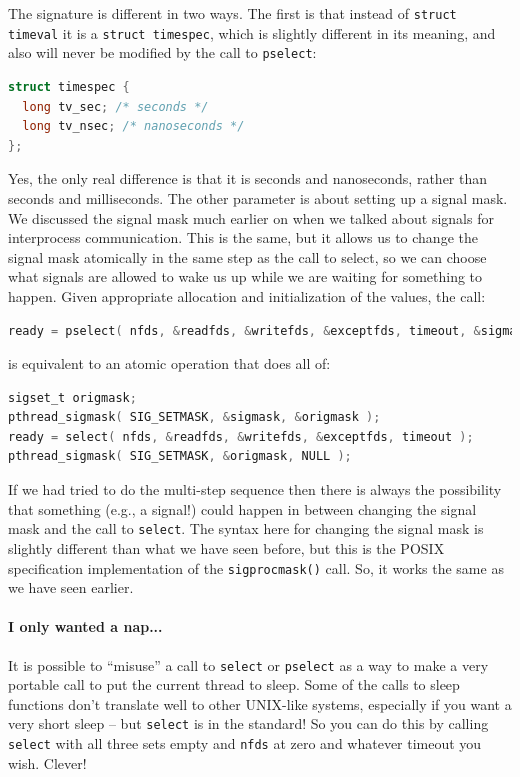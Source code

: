 \documentclass[a4paper]{report}
\begin{document}
The signature is different in two ways. The first is that instead of \texttt{struct timeval} it is a \texttt{struct timespec}, which is slightly different in its meaning, and also will never be modified by the call to \texttt{pselect}:

\begin{lstlisting}[language=C]
struct timespec {
  long tv_sec; /* seconds */
  long tv_nsec; /* nanoseconds */
};
\end{lstlisting}

Yes, the only real difference is that it is seconds and nanoseconds, rather than seconds and milliseconds. The other parameter is about setting up a signal mask. We discussed the signal mask much earlier on when we talked about signals for interprocess communication. This is the same, but it allows us to change the signal mask atomically in the same step as the call to select, so we can choose what signals are allowed to wake us up while we are waiting for something to happen. Given appropriate allocation and initialization of the values, the call:


\begin{lstlisting}[language=C]
ready = pselect( nfds, &readfds, &writefds, &exceptfds, timeout, &sigmask );
\end{lstlisting}

is equivalent to an atomic operation that does all of:

\begin{lstlisting}[language=C]
sigset_t origmask;
pthread_sigmask( SIG_SETMASK, &sigmask, &origmask );
ready = select( nfds, &readfds, &writefds, &exceptfds, timeout );
pthread_sigmask( SIG_SETMASK, &origmask, NULL );
\end{lstlisting}

If we had tried to do the multi-step sequence then there is always the possibility that something (e.g., a signal!) could happen in between changing the signal mask and the call to \texttt{select}. The syntax here for changing the signal mask is slightly different than what we have seen before, but this is the POSIX specification implementation of the \texttt{sigprocmask()} call. So, it works the same as we have seen earlier.

\paragraph{I only wanted a nap...} It is possible to ``misuse'' a call to \texttt{select} or \texttt{pselect} as a way to make a very portable call to put the current thread to sleep. Some of the calls to sleep functions don't translate well to other UNIX-like systems, especially if you want a very short sleep -- but \texttt{select} is in the standard! So you can do this by calling \texttt{select} with all three sets empty and \texttt{nfds} at zero and whatever timeout you wish. Clever!
\end{document}
